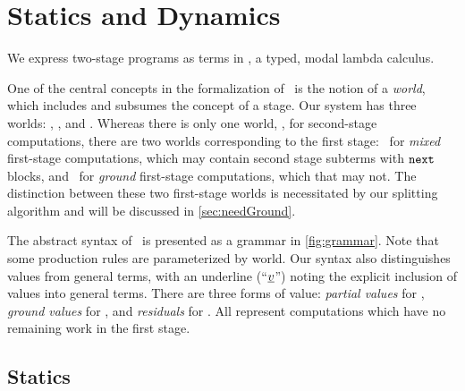 
\section{\texorpdfstring{\lang}{λ12} Statics and Dynamics}
\label{sec:semantics}



We express two-stage programs as terms in \lang, a typed, modal lambda calculus. 

One of the central concepts in the formalization of \lang\ is the notion of a \emph{world},
which includes and subsumes the concept of a stage.
Our system has three worlds: \bbonem, \bbonep, and \bbtwo.
Whereas there is only one world, \bbtwo, for second-stage computations,
there are two worlds corresponding to the first stage:
\bbonem\ for \emph{mixed} first-stage computations, which may contain second stage subterms with ${\tt next}$ blocks,
and \bbonep\ for \emph{ground} first-stage computations, which that may not.
The distinction between these two first-stage worlds is necessitated by our splitting algorithm
and will be discussed in \ref{sec:needGround}.

The abstract syntax of \lang\ is presented as a grammar in \ref{fig:grammar}.  
Note that some production rules are parameterized by world.
Our syntax also distinguishes values from general terms, 
with an underline (``$\underline{v}$'') noting the explicit inclusion of values into general terms.
There are three forms of value: \emph{partial values} for \bbonem, \emph{ground values} for \bbonep, and \emph{residuals} for \bbtwo.
All represent computations which have no remaining work in the first stage.

\subsection{Statics}
\label{sec:statics}



